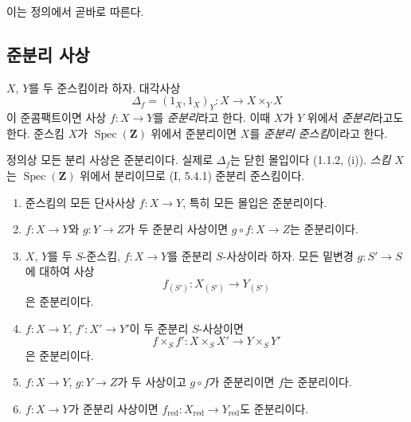 이는 정의에서 곧바로 따른다.

\subsection{준분리 사상}
\label{subsection:IV.1.2-fr}

\begin{definition}[1.2.1]
\label{IV.1.2.1-fr}
$X$, $Y$를 두 준스킴이라 하자. 대각사상
\[
  \Delta_f=(1_X,1_X)_Y:X\longrightarrow X\times_YX
\]
이 준콤팩트이면 사상 $f:X\to Y$를 \emph{준분리}라고 한다. 이때
$X$가 $Y$ 위에서 \emph{준분리}라고도 한다. 준스킴 $X$가
$\operatorname{Spec}(\mathbf Z)$ 위에서 준분리이면 $X$를
\emph{준분리 준스킴}이라고 한다.
\end{definition}

정의상 모든 분리 사상은 준분리이다. 실제로 $\Delta_f$는 닫힌
몰입이다 (1.1.2, (i)). \emph{스킴} $X$는
$\operatorname{Spec}(\mathbf Z)$ 위에서 분리이므로 (I, 5.4.1)
준분리 준스킴이다.

\begin{proposition}[1.2.2]
\label{IV.1.2.2-fr}
\begin{enumerate}
  \item[(i)] 준스킴의 모든 단사사상 $f:X\to Y$, 특히 모든 몰입은
  준분리이다.
  \item[(ii)] $f:X\to Y$와 $g:Y\to Z$가 두 준분리 사상이면
  $g\circ f:X\to Z$는 준분리이다.
  \item[(iii)] $X$, $Y$를 두 $S$-준스킴, $f:X\to Y$를 준분리
  $S$-사상이라 하자. 모든 밑변경 $g:S'\to S$에 대하여 사상
  \[
    f_{(S')}:X_{(S')}\longrightarrow Y_{(S')}
  \]
  은 준분리이다.
  \item[(iv)] $f:X\to Y$, $f':X'\to Y'$이 두 준분리 $S$-사상이면
  \[
    f\times_Sf':X\times_SX'\longrightarrow Y\times_SY'
  \]
  은 준분리이다.
  \item[(v)] $f:X\to Y$, $g:Y\to Z$가 두 사상이고 $g\circ f$가
  준분리이면 $f$는 준분리이다.
  \item[(vi)] $f:X\to Y$가 준분리 사상이면
  $f_{\mathrm{red}}:X_{\mathrm{red}}\to Y_{\mathrm{red}}$도
  준분리이다.
\end{enumerate}
\end{proposition}

